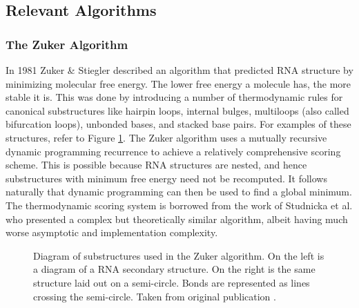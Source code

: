\documentclass[12pt, a4paper]{article}
\begin{document}
\subsection{Relevant Algorithms}
\subsubsection{The Zuker Algorithm}
In 1981 Zuker \& Stiegler \cite{zuker1981optimal}
described an algorithm that predicted RNA structure by minimizing molecular free energy. The lower free energy a molecule has, the more stable it is. This was done
by introducing a number of thermodynamic rules for canonical substructures like hairpin loops, internal bulges, multiloops (also called bifurcation loops), unbonded bases, and stacked base pairs. For examples of these structures, refer to Figure \ref{fig:zuk_struct}. The Zuker algorithm uses a mutually recursive dynamic programming recurrence to achieve a relatively comprehensive scoring scheme. This is possible because RNA structures are nested, and hence substructures with minimum free energy need not be recomputed. It follows naturally that dynamic programming can then be used to find a global minimum. The thermodynamic scoring system is borrowed from the work of Studnicka et al. \cite{studnicka1978computer} who presented a
complex but theoretically similar algorithm, albeit having
much worse asymptotic and implementation complexity. 

\begin{figure}
\begin{center}
\end{center}
\caption{Diagram of substructures used in the Zuker algorithm. On the left is a diagram of a RNA secondary structure. On the right is the same structure laid out on a semi-circle. Bonds are represented as lines crossing the semi-circle. Taken from original
publication \cite{zuker1981optimal}.}
\label{fig:zuk_struct}
\end{figure}
\end{document}
